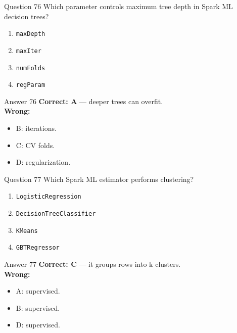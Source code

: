 \documentclass[aspectratio=169,11pt]{beamer}
\begin{document}
\begin{frame}{Question 76}
Which parameter controls maximum tree depth in Spark ML decision trees?
\begin{enumerate}[label=\Alph*.]
\item \texttt{maxDepth}
\item \texttt{maxIter}
\item \texttt{numFolds}
\item \texttt{regParam}
\end{enumerate}
\end{frame}
\begin{frame}{Answer 76}
\textbf{Correct: A} --- deeper trees can overfit.\\
\vspace{0.5em}
\textbf{Wrong:}
\begin{itemize}
\item B: iterations.
\item C: CV folds.
\item D: regularization.
\end{itemize}
\end{frame}

\begin{frame}{Question 77}
Which Spark ML estimator performs clustering?
\begin{enumerate}[label=\Alph*.]
\item \texttt{LogisticRegression}
\item \texttt{DecisionTreeClassifier}
\item \texttt{KMeans}
\item \texttt{GBTRegressor}
\end{enumerate}
\end{frame}
\begin{frame}{Answer 77}
\textbf{Correct: C} --- it groups rows into k clusters.\\
\vspace{0.5em}
\textbf{Wrong:}
\begin{itemize}
\item A: supervised.
\item B: supervised.
\item D: supervised.
\end{itemize}
\end{frame}
\end{document}
